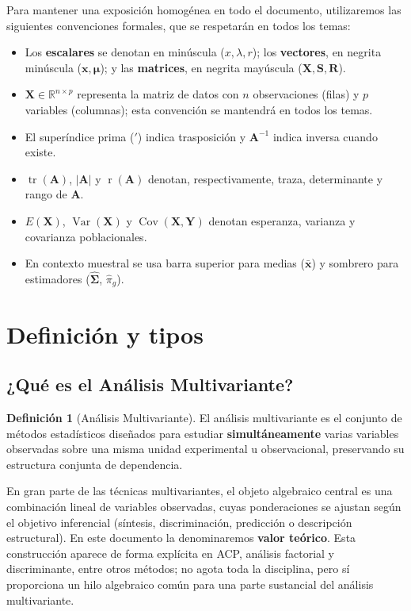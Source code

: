 \documentclass[12pt, a4paper]{article}
\theoremstyle{plain}
\theoremstyle{definition}
\newtheorem{definicion}[teorema]{Definición}
\theoremstyle{remark}
\newcommand{\R}{\mathbb{R}}
\newcommand{\mat}[1]{\mathbf{#1}}
\newcommand{\tr}{\operatorname{tr}}
\newcommand{\rg}{\operatorname{r}}
\newcommand{\Var}{\operatorname{Var}}
\newcommand{\Cov}{\operatorname{Cov}}
\begin{document}
Para mantener una exposición homogénea en todo el documento, utilizaremos las
siguientes convenciones formales, que se respetarán en todos los temas:
\begin{itemize}
  \item Los \textbf{escalares} se denotan en minúscula ($x,\lambda,r$); los
        \textbf{vectores}, en negrita minúscula
        ($\mathbf{x},\boldsymbol{\mu}$); y las \textbf{matrices}, en negrita
        mayúscula ($\mat{X},\mat{S},\mat{R}$).
  \item $\mat{X}\in\R^{n\times p}$ representa la matriz de datos con
        $n$ observaciones (filas) y $p$ variables (columnas); esta convención
        se mantendrá en todos los temas.
  \item El superíndice prima ($'$) indica trasposición y
        $\mat{A}^{-1}$ indica inversa cuando existe.
  \item $\tr(\mat{A})$, $|\mat{A}|$ y $\rg(\mat{A})$ denotan, respectivamente,
        traza, determinante y rango de $\mat{A}$.
  \item $E(\mathbf{X})$, $\Var(\mathbf{X})$ y $\Cov(\mathbf{X},\mathbf{Y})$
        denotan esperanza, varianza y covarianza poblacionales.
  \item En contexto muestral se usa barra superior para medias
        ($\bar{\mathbf{x}}$) y sombrero para estimadores
        ($\hat{\boldsymbol{\Sigma}}$, $\hat{\pi}_g$).
\end{itemize}

\section{Definición y tipos}

\subsection{¿Qué es el Análisis Multivariante?}

\begin{definicion}[Análisis Multivariante]
El análisis multivariante es el conjunto de métodos estadísticos diseñados
para estudiar \textbf{simultáneamente} varias variables observadas sobre una
misma unidad experimental u observacional, preservando su estructura conjunta
de dependencia.
\end{definicion}

En gran parte de las técnicas multivariantes, el objeto algebraico central es
una combinación lineal de variables observadas, cuyas ponderaciones se ajustan
según el objetivo inferencial (síntesis, discriminación, predicción o
descripción estructural). En este documento la denominaremos
\textbf{valor teórico}.
Esta construcción aparece de forma explícita en ACP, análisis factorial y
discriminante, entre otros métodos; no agota toda la disciplina, pero sí
proporciona un hilo algebraico común para una parte sustancial del análisis
multivariante.
\end{document}
